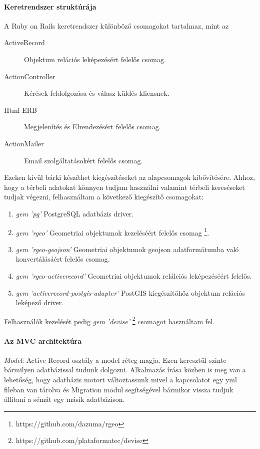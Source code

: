 \paragraph{Keretrendszer struktúrája}
A Ruby on Rails keretrendszer különböző csomagokat tartalmaz, mint az
\begin{description}
  \item[ActiveRecord] Objektum relációs leképezésért felelős csomag.
  \item[ActionController] Kérések feldolgozása és válasz küldés kliensnek.
  \item[Html ERB] Megjelenítés és Elrendezésért felelős csomag.
  \item[ActionMailer] Email szolgáltatásokért felelős csomag.
\end{description}
Ezeken kívül bárki készíthet kiegészítéseket az alapcsomagok kibővítésére. Ahhoz, hogy a térbeli adatokat könnyen tudjam használni valamint térbeli kereséseket tudjak végezni, felhasználtam a következő kiegészítő csomagokat:
\begin{enumerate}
  \item \emph{gem 'pg'} PostgreSQL adatbázis driver.
  \item \emph{gem 'rgeo'} Geometriai objektumok kezeléséért felelős csomag \footnote{https://github.com/dazuma/rgeo}.
  \item \emph{gem 'rgeo-geojson'} Geometriai objektumok geojson adatformátumba való konvertálásáért felelős csomag.
  \item \emph{gem 'rgeo-activerecord'} Geometriai objektumok relálciós leképezéséért felelős.
  \item \emph{gem 'activerecord-postgis-adapter'} PostGIS kiegészítőhöz  objektum relációs leképező driver.
\end{enumerate}

  Felhasználók kezelését pedig \emph{gem 'devise'} \footnote{https://github.com/plataformatec/devise } csomagot használtam fel.
  
  \paragraph{Az MVC architektúra}
	\emph{Model}: Active Record osztály a model réteg magja. Ezen keresztül szinte bármilyen adatbázissal tudunk dolgozni. 
	Alkalmazás írása közben is meg van a lehetőség, hogy adatbázis motort változtassunk mivel a kapcsolatot egy yml fileban van tárolva
	és Migration modul segítségével bármikor vissza tudjuk állítani a sémát egy másik adatbázison.
	
